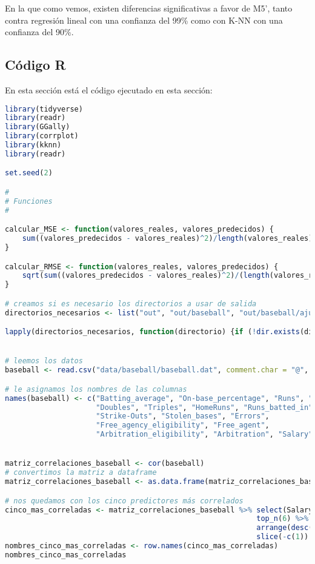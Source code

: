 En la que como vemos, existen diferencias significativas a favor de M5', tanto contra regresión lineal con una confianza del 99\% como con K-NN con una confianza del 90\%.

\subsection{Código R}

En esta sección está el código ejecutado en esta sección:

\begin{lstlisting}[language=R]
library(tidyverse)
library(readr)
library(GGally)
library(corrplot)
library(kknn)
library(readr)

set.seed(2)

#
# Funciones
#

calcular_MSE <- function(valores_reales, valores_predecidos) {
	sum((valores_predecidos - valores_reales)^2)/length(valores_reales)
}

calcular_RMSE <- function(valores_reales, valores_predecidos) {
	sqrt(sum((valores_predecidos - valores_reales)^2)/(length(valores_reales)-2))
}

# creamos si es necesario los directorios a usar de salida
directorios_necesarios <- list("out", "out/baseball", "out/baseball/ajuste_lm")

lapply(directorios_necesarios, function(directorio) {if (!dir.exists(directorio)) dir.create(directorio) })


# leemos los datos
baseball <- read.csv("data/baseball/baseball.dat", comment.char = "@", header = FALSE)

# le asignamos los nombres de las columnas
names(baseball) <- c("Batting_average", "On-base_percentage", "Runs", "Hits",
					 "Doubles", "Triples", "HomeRuns", "Runs_batted_in", "Walks",
					 "Strike-Outs", "Stolen_bases", "Errors",
					 "Free_agency_eligibility", "Free_agent",
					 "Arbitration_eligibility", "Arbitration", "Salary")


matriz_correlaciones_baseball <- cor(baseball)
# convertimos la matriz a dataframe
matriz_correlaciones_baseball <- as.data.frame(matriz_correlaciones_baseball)

# nos quedamos con los cinco predictores más correlados
cinco_mas_correladas <- matriz_correlaciones_baseball %>% select(Salary) %>% # nos quedamos solo con la fila de salario
														  top_n(6) %>% # nos quedamos con las 6 mejores (son todas positivas)
														  arrange(desc(Salary)) %>% # las ordenamos por correlacion
														  slice(-c(1)) # eliminamos la primera fila (el propio salario)
nombres_cinco_mas_correladas <- row.names(cinco_mas_correladas)
nombres_cinco_mas_correladas


\end{lstlisting}
